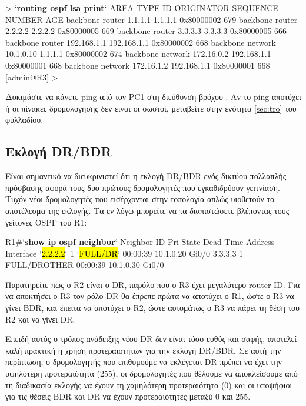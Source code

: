 \documentclass{EdipyLabs} %
\begin{document}
\begin{CommandBox}
[admin@R3] > `\textbf{routing ospf lsa print}`
AREA         TYPE      ID            ORIGINATOR   SEQUENCE-NUMBER    AGE
backbone     router    1.1.1.1       1.1.1.1           0x80000002    679
backbone     router    2.2.2.2       2.2.2.2           0x80000005    669
backbone     router    3.3.3.3       3.3.3.3           0x80000005    666
backbone     router    192.168.1.1   192.168.1.1       0x80000002    668
backbone     network   10.1.0.10     1.1.1.1           0x80000002    674
backbone     network   172.16.0.2    192.168.1.1       0x80000001    668
backbone     network   172.16.1.2    192.168.1.1       0x80000001    668
[admin@R3] > 
\end{CommandBox} 


Δοκιμάστε να κάνετε ping από τον PC1 στη διεύθυνση βρόχου . Αν το ping αποτύχει ή οι πίνακες δρομολόγησης δεν είναι οι σωστοί, μεταβείτε στην ενότητα \ref{sec:tro} του φυλλαδίου.

\subsection{Εκλογή DR/BDR}

Είναι σημαντικό να διευκρινιστεί ότι η εκλογή DR/BDR ενός δικτύου πολλαπλής πρόσβασης αφορά τους δυο πρώτους δρομολογητές  που εγκαθιδρύουν γειτνίαση. Τυχόν νέοι δρομολογητές που εισέρχονται στην τοπολογία απλώς υιοθετούν το αποτέλεσμα της εκλογής. Τα εν λόγω μπορείτε να τα διαπιστώσετε βλέποντας τους γείτονες OSPF του R1:

\begin{CommandBox}
R1#`\textbf{show ip ospf neighbor}`
Neighbor ID     Pri   State          Dead Time   Address      Interface
`\hl{2.2.2.2}`           1   `\hl{FULL/DR}`        00:00:39    10.1.0.20    Gi0/0
3.3.3.3           1   FULL/DROTHER   00:00:39    10.1.0.30    Gi0/0
\end{CommandBox} 

Παρατηρείτε πως ο R2 είναι ο DR, παρόλο που ο R3 έχει μεγαλύτερο router ID.%
Για να αποκτήσει ο R3 τον ρόλο DR θα έπρεπε πρώτα να αποτύχει ο R1, ώστε ο R3 να γίνει BDR, και έπειτα να αποτύχει ο R2, ώστε αυτομάτως ο R3 να πάρει τη θέση του R2 και να γίνει DR. 

Επειδή αυτός ο τρόπος ανάδειξης νέου DR δεν είναι τόσο ευθύς και σαφής, αποτελεί καλή πρακτική η χρήση προτεραιοτήτων για την εκλογή DR/BDR. Σε αυτή την περίπτωση, ο δρομολογητής που επιθυμούμε να εκλέγεται DR πρέπει να έχει την υψηλότερη προτεραιότητα (255), οι δρομολογητές που θέλουμε να αποκλείσουμε από τη διαδικασία εκλογής να έχουν τη χαμηλότερη προτεραιότητα (0) και οι υποψήφιοι για τις θέσεις BDR και DR να έχουν προτεραιότητες μεταξύ 0 και 255.
\end{document}
